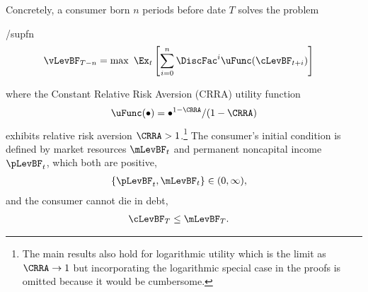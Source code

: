 \documentclass[ProjectDLO]{subfiles}
\begin{document}
Concretely, a consumer born $n$ periods before date $T$ solves the problem
\begin{verbatimwrite}{\EqDir/supfn}
  \begin{align*}%
    \vLevBF_{T-n} & = \max~ \Ex_{t}\left[\sum_{i=0}^{n} \DiscFac^{i} \uFunc(\cLevBF_{t+i})\right]
  \end{align*}
\end{verbatimwrite}

where the Constant Relative Risk Aversion (CRRA) utility function
\begin{align}
  \uFunc(\bullet)=\bullet^{1-\CRRA}/(1-\CRRA) \label{eq:crrautil}
\end{align}
exhibits relative risk aversion $\CRRA > 1$.\footnote{The main
  results also hold for logarithmic utility which is the limit as
  $\CRRA \rightarrow 1$ but incorporating the logarithmic special case
  in the proofs is omitted because it would be cumbersome.}  The consumer's initial condition is
defined by market resources $\mLevBF_{t}$ and permanent noncapital income $\pLevBF_{t}$, which
both are positive,
\begin{align}
  \{\pLevBF_{t},\mLevBF_{t}\} & \in (0,\infty) \label{eq:pLevBFandmLevBFgt0},
\end{align}
and the consumer cannot die in debt,
\begin{align}
  \cLevBF_{T} & \leq  \mLevBF_{T} \label{eq:NoDebtAtDeath}.
\end{align}

\hypertarget{checkRestrictions}{}
\end{document}
